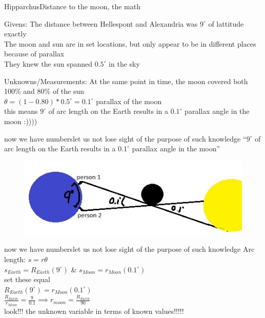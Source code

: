 \documentclass[12pt]{beamer}
\begin{document}
        \begin{frame}{Hipparchus}{Distance to the moon, the math} \centering
            \begin{block}{Givens:}
                The distance between Hellespont and Alexandria was $9^\circ$ of lattitude exactly\\
                The moon and sun are in set locations, but only appear to be in different places because of parallax\\
                They knew the sun spanned $0.5^\circ$ in the sky
            \end{block}
            \pause
            \begin{block}{Unknowns/Measurements:}
                At the same point in time, the moon covered both 100\% and 80\% of the sun\\
                $\theta=(1-0.80)*0.5^\circ=0.1^\circ$ parallax of the moon\\
                this means $9^\circ$ of arc length on the Earth results in a $0.1^\circ$ parallax angle in the moon :))))
            \end{block}
        \end{frame}
        \begin{frame}{now we have numbers}{let us not lose sight of the purpose of such knowledge} \centering
            ``$9^\circ$ of arc length on the Earth results in a $0.1^\circ$ parallax angle in the moon''
            \begin{figure}
                \includegraphics[scale=0.7, frame]{hipparchusnums.jpeg}
            \end{figure}
        \end{frame}
        \begin{frame}{now we have numbers}{let us not lose sight of the purpose of such knowledge} \centering
            Arc length: $s=r\theta$\\ \vspace{0.5em}
            $s_{Earth}=R_{Earth}({9^\circ})$ \& $s_{Moon}=r_{Moon}({0.1^\circ})$\\ \vspace{0.5em}
            set these equal\\ \vspace{1em}
            \pause
            $R_{Earth}(9^\circ)=r_{Moon}(0.1^\circ)$\\ \vspace{1em}
            $\frac{R_{Earth}}{r_{Moon}}=\frac{9}{0.1} \implies r_{moon} = \frac{R_{Earth}}{90}$\\ \vspace{2em}
            look!!! the unknown variable in terms of known values!!!!!\\
        \end{frame}
\end{document}
